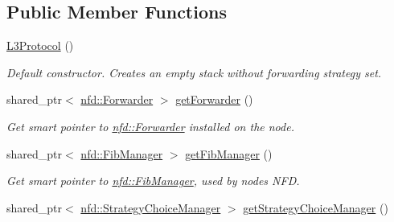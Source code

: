 \subsection*{Public Member Functions}
\begin{DoxyCompactItemize}
\item 
\hyperlink{classns3_1_1ndn_1_1L3Protocol_a3d798a7eaf77ae8c8af8c195d667f0c5}{L3\+Protocol} ()\hypertarget{classns3_1_1ndn_1_1L3Protocol_a3d798a7eaf77ae8c8af8c195d667f0c5}{}\label{classns3_1_1ndn_1_1L3Protocol_a3d798a7eaf77ae8c8af8c195d667f0c5}

\begin{DoxyCompactList}\small\item\em Default constructor. Creates an empty stack without forwarding strategy set. \end{DoxyCompactList}\item 
shared\+\_\+ptr$<$ \hyperlink{classnfd_1_1Forwarder}{nfd\+::\+Forwarder} $>$ \hyperlink{classns3_1_1ndn_1_1L3Protocol_a99e50a33b78f8dbe205499a7bc23f888}{get\+Forwarder} ()\hypertarget{classns3_1_1ndn_1_1L3Protocol_a99e50a33b78f8dbe205499a7bc23f888}{}\label{classns3_1_1ndn_1_1L3Protocol_a99e50a33b78f8dbe205499a7bc23f888}

\begin{DoxyCompactList}\small\item\em Get smart pointer to \hyperlink{classnfd_1_1Forwarder}{nfd\+::\+Forwarder} installed on the node. \end{DoxyCompactList}\item 
shared\+\_\+ptr$<$ \hyperlink{classnfd_1_1FibManager}{nfd\+::\+Fib\+Manager} $>$ \hyperlink{classns3_1_1ndn_1_1L3Protocol_acd87119ac6467ed5eb5d84770e8b1414}{get\+Fib\+Manager} ()\hypertarget{classns3_1_1ndn_1_1L3Protocol_acd87119ac6467ed5eb5d84770e8b1414}{}\label{classns3_1_1ndn_1_1L3Protocol_acd87119ac6467ed5eb5d84770e8b1414}

\begin{DoxyCompactList}\small\item\em Get smart pointer to \hyperlink{classnfd_1_1FibManager}{nfd\+::\+Fib\+Manager}, used by node\textquotesingle{}s N\+FD. \end{DoxyCompactList}\item 
shared\+\_\+ptr$<$ \hyperlink{classnfd_1_1StrategyChoiceManager}{nfd\+::\+Strategy\+Choice\+Manager} $>$ \hyperlink{classns3_1_1ndn_1_1L3Protocol_ae93294753f0c40d9ba4f4027382d9417}{get\+Strategy\+Choice\+Manager} ()\hypertarget{classns3_1_1ndn_1_1L3Protocol_ae93294753f0c40d9ba4f4027382d9417}{}\label{classns3_1_1ndn_1_1L3Protocol_ae93294753f0c40d9ba4f4027382d9417}


\end{DoxyCompactItemize}

